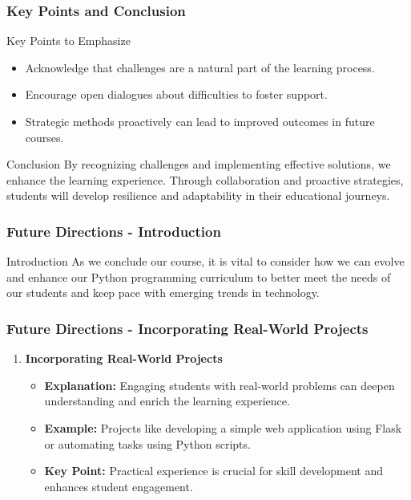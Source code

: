 \documentclass{beamer}
\begin{document}
\begin{frame}[fragile]
    \frametitle{Key Points and Conclusion}
    \begin{block}{Key Points to Emphasize}
        \begin{itemize}
            \item Acknowledge that challenges are a natural part of the learning process.
            \item Encourage open dialogues about difficulties to foster support.
            \item Strategic methods proactively can lead to improved outcomes in future courses.
        \end{itemize}
    \end{block}

    \begin{block}{Conclusion}
        By recognizing challenges and implementing effective solutions, we enhance the learning experience. Through collaboration and proactive strategies, students will develop resilience and adaptability in their educational journeys.
    \end{block}
\end{frame}

\begin{frame}[fragile]
    \frametitle{Future Directions - Introduction}
    \begin{block}{Introduction}
        As we conclude our course, it is vital to consider how we can evolve and enhance our Python programming curriculum to better meet the needs of our students and keep pace with emerging trends in technology. 
    \end{block}
\end{frame}

\begin{frame}[fragile]
    \frametitle{Future Directions - Incorporating Real-World Projects}
    \begin{enumerate}
        \item \textbf{Incorporating Real-World Projects}
        \begin{itemize}
            \item \textbf{Explanation:} Engaging students with real-world problems can deepen understanding and enrich the learning experience.  
            \item \textbf{Example:} Projects like developing a simple web application using Flask or automating tasks using Python scripts.
            \item \textbf{Key Point:} Practical experience is crucial for skill development and enhances student engagement.
        \end{itemize}
    \end{enumerate}
\end{frame}
\end{document}
